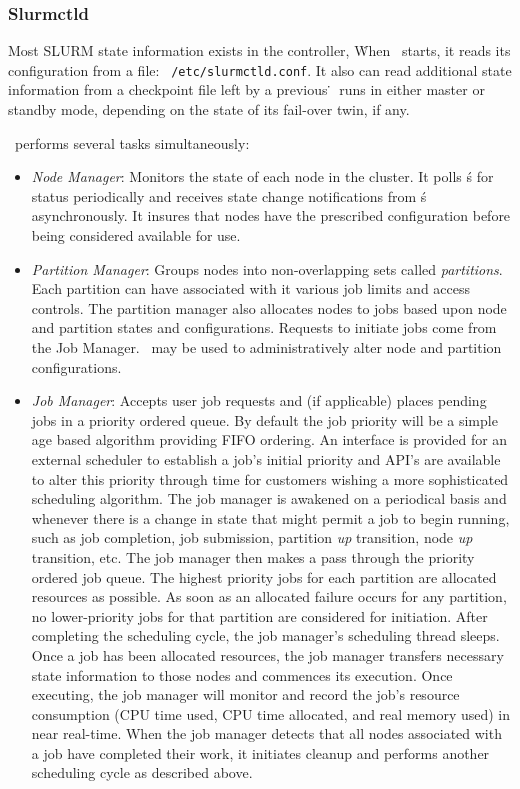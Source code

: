 \subsubsection{Slurmctld}

Most SLURM state information exists in the controller, \slurmctld\.
When \slurmctld\ starts, it reads its configuration from a file: {\tt
/etc/slurmctld.conf}.  It also can read additional state information
from a checkpoint file left by a previous \slurmctld\.
\slurmctld\ runs in either master or standby mode, depending on the
state of its fail-over twin, if any.

\slurmctld\ performs several tasks simultaneously:

\begin{itemize}
\item {\em Node Manager}: Monitors the state of each node in
the cluster.  It polls \slurmd\'s for status periodically and
receives state change notifications from \slurmd\'s asynchronously.
It insures that nodes have the prescribed configuration before being 
considered available for use.

\item {\em Partition Manager}: Groups nodes into non-overlapping sets called
{\em partitions}. Each partition can have associated with it various job
limits and access controls.  The partition manager also allocates nodes
to jobs based upon node and partition states and configurations. Requests
to initiate jobs come from the Job Manager.  \scontrol\ may be used
to administratively alter node and partition configurations.

\item {\em Job Manager}: Accepts user job requests and (if applicable)
places pending jobs in a priority ordered queue. By default the job
priority will be a simple age based algorithm providing FIFO ordering.
An interface is provided for an external scheduler to establish a job's
initial priority and API's are available to alter this priority through
time for customers wishing a more sophisticated scheduling algorithm.
The job manager is awakened on a periodical basis and whenever there
is a change in state that might permit a job to begin running, such
as job completion, job submission, partition {\em up} transition,
node {\em up} transition, etc.  The job manager then makes a pass
through the priority ordered job queue. The highest priority jobs 
for each partition are allocated resources as possible. As soon as an 
allocated failure occurs for any partition, no lower-priority jobs for 
that partition are considered for initiation. 
After completing the scheduling cycle, the job manager's scheduling
thread sleeps.  Once a job has been allocated resources, the job manager
transfers necessary state information to those nodes and commences
its execution.  Once executing, the job manager will monitor and record
the job's resource consumption (CPU time used, CPU time allocated, and
real memory used) in near real-time.  When the job manager detects that
all nodes associated with a job have completed their work, it initiates
cleanup and performs another scheduling cycle as described above.


\end{itemize}
